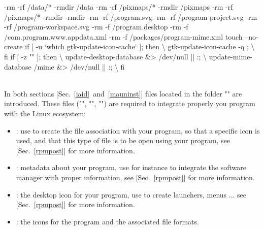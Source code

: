 {\footnotesize{
\begin{script}
\tabul -rm -rf /data/*
\tabul -rmdir /data
\tabul -rm -rf /pixmaps/*
\tabul -rmdir /pixmaps
\tabul -rm -rf /pixmaps/*
\tabul -rmdir 
\tabul -rmdir 
\tabul -rm -rf /program.svg
\tabul -rm -rf /program-project.svg
\tabul -rm -rf /program-workspace.svg
\tabul -rm -f /program.desktop
\tabul -rm -f /com.program.www.appdata.xml
\tabul -rm -f /packages/program-mime.xml
\tabul touch --no-create 
\tabul if [ -u `which gtk-update-icon-cache` ]; then \textbackslash
\tabul   gtk-update-icon-cache -q ; \textbackslash
\tabul fi
\tabul if [ -z "" ]; then \textbackslash
\tabul \tabul update-desktop-database  &> /dev/null || :; \textbackslash
\tabul \tabul update-mime-database /mime &> /dev/null || :; \textbackslash
\tabul fi
\end{script}
}}
\\
\noindent In both sections [Sec.~\ref{iaid}~and~\ref{mauninst}] files located in the folder "" are introduced.
These files ("", "", "") are required to integrate properly you program with the Linux ecosystem:
\begin{itemize}
\item {}: use to create the file association with your program, so that a specific icon is used, and that this type of file is to be open using your program, see [Sec.~\ref{rpmpost}] for more information. 
\item {}: metadata about your program, use for instance to integrate the software manager with proper information, see [Sec.~\ref{rpmpost}] for more information.
\item {}: the desktop icon for your program, use to create launchers, menus ... see [Sec.~\ref{rpmpost}] for more information.
\item {}: the icons for the program and the associated file formats.
\end{itemize}

